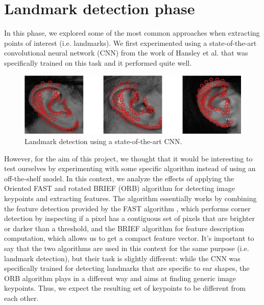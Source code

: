 \documentclass{article}
\begin{document}
\section{Landmark detection phase}

In this phase, we explored some of the most common approaches when extracting points
of interest (i.e. landmarks). We first experimented using a state-of-the-art convolutional neural network
(CNN) from the work of Hansley et al. \cite{iet:/content/journals/10.1049/iet-bmt.2017.0210}
that was specifically trained on this task and it performed quite well.

\begin{figure}[h]
    \label{fig:landmark}
    \begin{center}
        \includegraphics[width=12cm,keepaspectratio]{images/landmark2.png}
        \caption{Landmark detection using a state-of-the-art CNN.}
    \end{center}
\end{figure}

However, for the aim of this project, we thought that it would be interesting to test ourselves
by experimenting with some specific algorithm instead of using an off-the-shelf model. In this context,
we analyze the effects of applying the Oriented FAST and rotated BRIEF (ORB) algorithm \cite{conf/iccv/RubleeRKB11}
for detecting
image keypoints and extracting features. The algorithm essentially works by combining the feature detection
provided by the FAST algorithm \cite{rosten_2006_machine}, which performs corner detection by inspecting if a pixel
has a contiguous
set of pixels that are brighter or darker than a threshold, and the BRIEF algorithm \cite{Calonder:2010:BBR:1888089.1888148}
for feature description
computation, which allows us to get a compact feature vector. It's important to say that the two
algorithms are used in this context for the same purpose (i.e. landmark detection), but their task is
slightly different: while the CNN was specifically trained for detecting landmarks that are specific to ear
shapes, the ORB algorithm plays in a different way and aims at finding generic image keypoints. Thus,
we expect the resulting set of keypoints to be different from each other.
\end{document}
